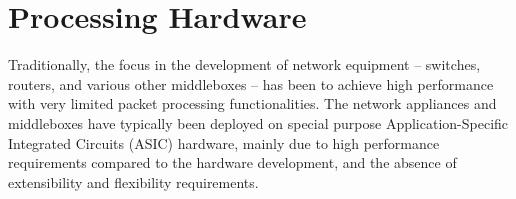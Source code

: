 


\section{Processing Hardware}
\label{sec:hardware-architecture}




Traditionally, the focus in the development of network equipment -- switches, routers, and various other middleboxes -- has been to achieve high performance with very limited packet processing functionalities. The network appliances and middleboxes have typically been deployed on special purpose Application-Specific Integrated Circuits (ASIC) hardware, mainly due to high performance requirements compared to the hardware development, and the absence of extensibility and flexibility requirements.~\cite{Dobrescu:2009:REP}

